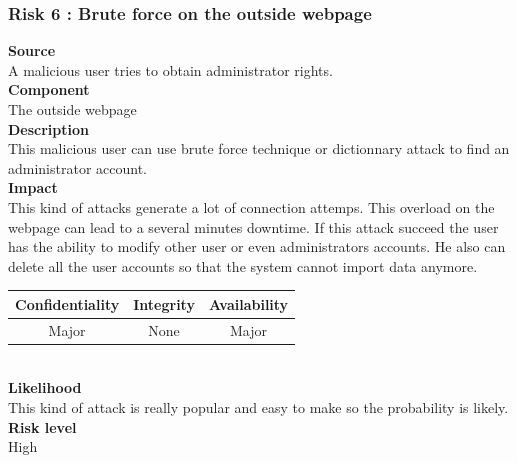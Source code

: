 \documentclass[a4paper,11pt]{article}
\begin{document}
\subsubsection{Risk 6 : Brute force on the outside webpage }
\textbf{Source} \\A malicious user tries to obtain administrator rights.\\
\textbf{Component} \\The outside webpage\\
\textbf{Description}\\This malicious user can use brute force technique or dictionnary attack to find an administrator account. \\
\textbf{Impact}\\
This kind of attacks generate a lot of connection attemps. This overload on the webpage can lead to a several minutes downtime. If this attack succeed the user has the ability to modify other user or even administrators accounts. He also can delete all the user accounts so that the system cannot import data anymore.\\
\begin{tabular}{|c|c|c|}
\hline
Confidentiality & Integrity & Availability \\
\hline
Major & None & Major \\
\hline
\end{tabular}\\
\textbf{Likelihood}\\ This kind of attack is really popular and easy to make so the probability is likely.\\
\textbf{Risk level}\\High\\
\end{document}
